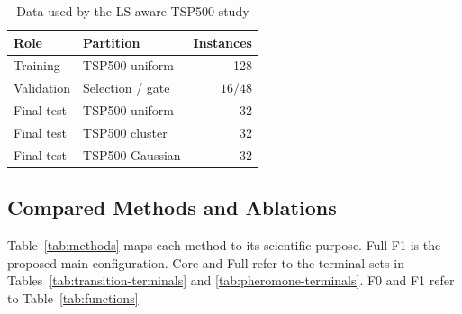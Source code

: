 \documentclass[letterpaper,journal]{IEEEtran}
\begin{document}
\begin{table}[t]
\caption{Data used by the LS-aware TSP500 study}
\label{tab:ls-data}
\centering
\footnotesize
\begin{tabular}{llr}
\toprule
Role & Partition & Instances\\
\midrule
Training & TSP500 uniform & 128\\
Validation & Selection / gate & \(16/48\)\\
Final test & TSP500 uniform & 32\\
Final test & TSP500 cluster & 32\\
Final test & TSP500 Gaussian & 32\\
\bottomrule
\end{tabular}
\end{table}

\subsection{Compared Methods and Ablations}

Table~\ref{tab:methods} maps each method to its scientific purpose.
Full-F1 is the proposed main configuration.
Core and Full refer to the terminal sets in Tables~\ref{tab:transition-terminals} and \ref{tab:pheromone-terminals}.
F0 and F1 refer to Table~\ref{tab:functions}.
\end{document}
